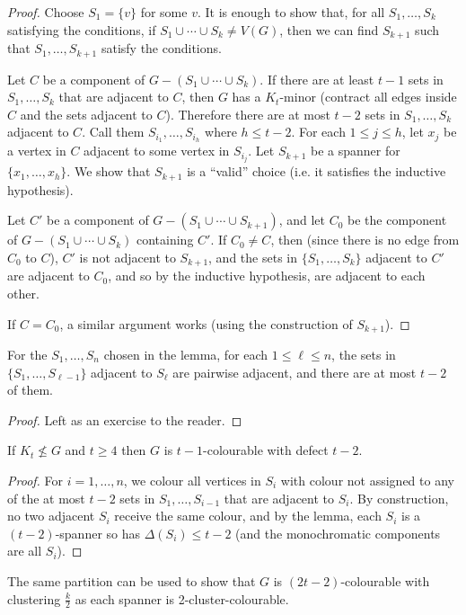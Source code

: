 \documentclass[main.tex]{subfiles}
\begin{document}
\begin{proof}
  Choose $S_1 = \{v\}$ for some $v$.
  It is enough to show that, for all $S_1,\ldots,S_k$ satisfying the conditions,
  if $S_1\cup\cdots\cup S_k\neq V(G)$, then we can find $S_{k+1}$ such that
  $S_1,\ldots,S_{k+1}$ satisfy the conditions.

  Let $C$ be a component of $G - (S_1\cup\cdots\cup S_k)$.
  If there are at least $t-1$ sets in $S_1,\ldots,S_k$ that are adjacent to $C$,
  then $G$ has a $K_t$-minor (contract all edges inside $C$ and the sets
  adjacent to $C$).
  Therefore there are at most $t-2$ sets in $S_1,\ldots,S_k$ adjacent to $C$.
  Call them $S_{i_1},\ldots,S_{i_h}$ where $h\leq t-2$.
  For each $1\leq j\leq h$, let $x_j$ be a vertex in $C$ adjacent to some vertex
  in $S_{i_j}$.
  Let $S_{k+1}$ be a spanner for $\{x_1,\ldots,x_h\}$.
  We show that $S_{k+1}$ is a ``valid'' choice
  (i.e. it satisfies the inductive hypothesis).

  Let $C'$ be a component of $G - (S_1\cup\cdots\cup S_{k+1})$, and let $C_0$
  be the component of $G - (S_1\cup\cdots\cup S_k)$ containing $C'$.
  If $C_0\neq C$, then (since there is no edge from $C_0$ to $C$),
  $C'$ is not adjacent to $S_{k+1}$, and the sets in $\{S_1,\ldots,S_k\}$
  adjacent to $C'$ are adjacent to $C_0$, and so by the inductive
  hypothesis, are adjacent to each other.

  If $C = C_0$, a similar argument works (using the construction of $S_{k+1}$).
\end{proof}
\begin{corollary}
  For the $S_1,\ldots,S_n$ chosen in the lemma, for each $1\leq\ell\leq n$,
  the sets in $\{S_1,\ldots,S_{\ell-1}\}$ adjacent to $S_\ell$ are pairwise
  adjacent, and there are at most $t-2$ of them.
\end{corollary}
\begin{proof}
  Left as an exercise to the reader.
\end{proof}
\begin{corollary}
  If $K_t\not\leq G$ and $t\geq 4$ then $G$ is $t-1$-colourable with defect $t-2$.
\end{corollary}
\begin{proof}
  For $i = 1, \ldots, n$, we colour all vertices in $S_i$ with colour not
  assigned to any of the at most $t-2$ sets in $S_1,\ldots,S_{i-1}$ that are
  adjacent to $S_i$.
  By construction, no two adjacent $S_i$ receive the same colour,
  and by the lemma, each $S_i$ is a $(t-2)$-spanner so has $\Delta(S_i)\leq t-2$
  (and the monochromatic components are all $S_i$).
\end{proof}
\begin{remark*}
  The same partition can be used to show that $G$ is $(2t-2)$-colourable with
  clustering $\frac{k}{2}$ as each spanner is 2-cluster-colourable.
\end{remark*}
\end{document}
